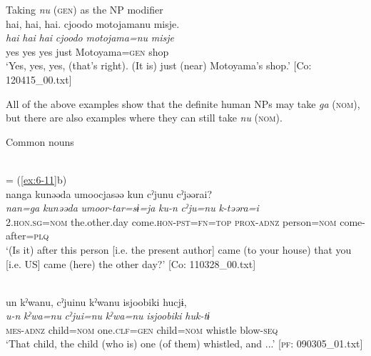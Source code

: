 \begin{styleBeschriftung}
\ex Taking \textit{nu} (\textsc{gen}) as the NP modifier\\
{\TM}
\glll  {\textbar}hai,  hai,  hai{\textbar}.  cjoodo  motojamanu  misje.\\
\textit{hai}  \textit{hai}  \textit{hai}  \textit{cjoodo}  \textit{motojama=nu}  \textit{misje}\\
yes  yes  yes  just  Motoyama=\textsc{gen}  shop\\
\glt ‘Yes, yes, yes, (that’s right). (It is) just (near) Motoyama’s shop.’ [Co: 120415\_00.txt]
\z

  All of the above examples show that the definite human NPs may take \textit{ga} (\textsc{nom}), but there are also examples where they can still take \textit{nu} (\textsc{nom}).

\ea\label{ex:6-135}
  Common nouns

 \ea{}\\
\glll = (\ref{ex:6-11}b)\\

{\TM}
\glll nanga  kunəəda  umoocjasəə  kun    cˀjunu  cˀjəərai?\\
      \textit{nan=ga}  \textit{kunəəda}  \textit{umoor-tar=sɨ=ja}  \textit{ku-n}   \textit{cˀju=nu}  \textit{k-təəra=i}\\
      2.\textsc{hon}.\textsc{sg}=\textsc{nom}  the.other.day  come.\textsc{hon}-\textsc{pst}=\textsc{fn}=\textsc{top}  \textsc{prox}-\textsc{adnz}      person=\textsc{nom}  come-after=\textsc{plq}\\
\glt ‘(Is it) after this person [i.e. the present author] came (to your house) that you [i.e. US] came (here) the other day?’ [Co: 110328\_00.txt]
\z

\ex{}\\
{\TM}
\glll  un  kˀwanu,  cˀjuinu  kˀwanu  isjoobiki      hucjɨ,\\
\textit{u-n}  \textit{kˀwa=nu}  \textit{cˀjui=nu}  \textit{kˀwa=nu}  \textit{isjoobiki}   \textit{huk-tɨ}\\
\textsc{mes}-\textsc{adnz}  child=\textsc{nom}  one.\textsc{clf}=\textsc{gen}  child=\textsc{nom}  whistle  blow-\textsc{seq}\\
\glt ‘That child, the child (who is) one (of them) whistled, and ...’ [\textsc{pf}: 090305\_01.txt]
\z


\end{styleBeschriftung}

